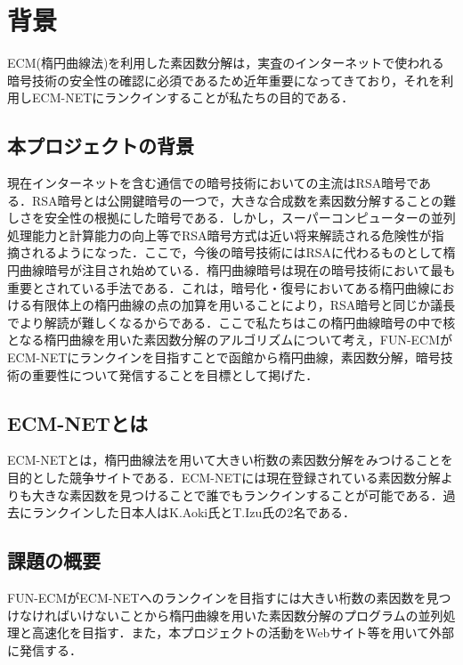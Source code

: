\documentclass[openany,11pt,papersize]{jsbook}
\begin{document}
\chapter{背景}

ECM(楕円曲線法)を利用した素因数分解は，実査のインターネットで使われる暗号技術の安全性の確認に必須であるため近年重要になってきており，それを利用しECM-NETにランクインすることが私たちの目的である．


\section{本プロジェクトの背景}

現在インターネットを含む通信での暗号技術においての主流はRSA暗号である．RSA暗号とは公開鍵暗号の一つで，大きな合成数を素因数分解することの難しさを安全性の根拠にした暗号である．しかし，スーパーコンピューターの並列処理能力と計算能力の向上等でRSA暗号方式は近い将来解読される危険性が指摘されるようになった．ここで，今後の暗号技術にはRSAに代わるものとして楕円曲線暗号が注目され始めている．楕円曲線暗号は現在の暗号技術において最も重要とされている手法である．これは，暗号化・復号においてある楕円曲線における有限体上の楕円曲線の点の加算を用いることにより，RSA暗号と同じか議長でより解読が難しくなるからである．ここで私たちはこの楕円曲線暗号の中で核となる楕円曲線を用いた素因数分解のアルゴリズムについて考え，FUN-ECMがECM-NETにランクインを目指すことで函館から楕円曲線，素因数分解，暗号技術の重要性について発信することを目標として掲げた．


\section{ECM-NETとは}

ECM-NETとは，楕円曲線法を用いて大きい桁数の素因数分解をみつけることを目的とした競争サイトである．ECM-NETには現在登録されている素因数分解よりも大きな素因数を見つけることで誰でもランクインすることが可能である．過去にランクインした日本人はK.Aoki氏とT.Izu氏の2名である．


\section{課題の概要}\label{sec:gaiyou}

FUN-ECMがECM-NETへのランクインを目指すには大きい桁数の素因数を見つけなければいけないことから楕円曲線を用いた素因数分解のプログラムの並列処理と高速化を目指す．また，本プロジェクトの活動をWebサイト等を用いて外部に発信する．

\end{document}

